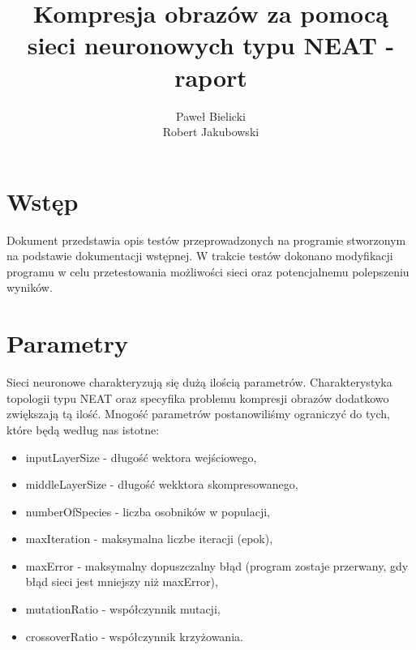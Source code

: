 \documentclass[12pt,a4paper,oneside]{article}
\begin{document}
\begin{titlepage}
\title{ Kompresja obrazów za pomocą sieci neuronowych typu NEAT - raport}
\maketitle


\begin{flushright}
\author{
\bigskip
Paweł Bielicki
\\Robert Jakubowski}
\end{flushright}

\end{titlepage}

\section{Wstęp}
Dokument przedstawia opis testów przeprowadzonych na programie stworzonym na podstawie dokumentacji wstępnej. W trakcie testów dokonano modyfikacji programu w celu przetestowania możliwości sieci oraz potencjalnemu polepszeniu wyników.

\section{Parametry}
Sieci neuronowe charakteryzują się dużą ilością parametrów. Charakterystyka topologii typu NEAT oraz specyfika problemu kompresji obrazów dodatkowo zwiększają tą ilość. Mnogość parametrów postanowiliśmy ograniczyć do tych, które będą według nas istotne:
\begin{itemize}
	\item inputLayerSize - długość wektora wejściowego,
	\item middleLayerSize - długość wekktora skompresowanego,
	\item numberOfSpecies - liczba osobników w populacji,
	\item maxIteration - maksymalna liczbe iteracji (epok),
	\item maxError - maksymalny dopuszczalny błąd (program zostaje przerwany, gdy błąd sieci jest mniejszy niż maxError),
	\item mutationRatio - współczynnik mutacji,
	\item crossoverRatio - współczynnik krzyżowania.
\end{itemize}
\end{document}
